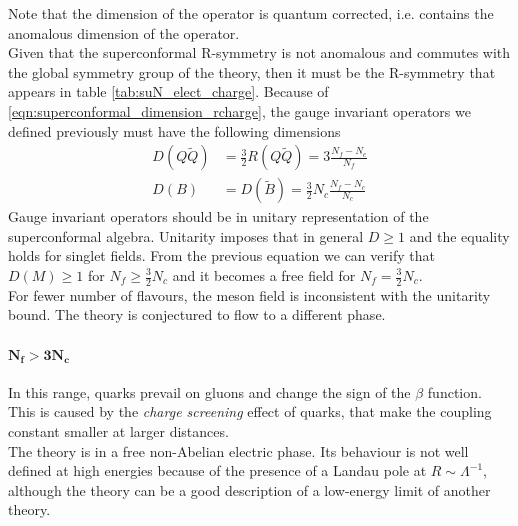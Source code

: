Note that the dimension of the operator is quantum corrected, i.e. contains the anomalous dimension of the operator.
\\
Given that the superconformal R-symmetry is not anomalous and commutes with the global symmetry group of the theory, then it must be the R-symmetry that appears in table \ref{tab:suN_elect_charge}.
Because of \eqref{eqn:superconformal_dimension_rcharge}, the gauge invariant operators we defined previously must have the following dimensions
\begin{align}
 D(Q \tilde{Q}) &= \frac{3}{2} R(Q \tilde{Q}) = 3 \frac{N_f - N_c}{N_f}\\
 D(B) & = D(\tilde{B})  = \frac{3}{2} N_c \frac{N_f - N_c}{N_c}
\end{align}
Gauge invariant operators should be in unitary representation of the superconformal algebra.
Unitarity imposes that in general $D\geq 1$ and the equality holds for singlet fields.
From the previous equation we can verify that $D(M) \geq 1$ for $ N_f \geq \frac{3}{2}N_c$ and it becomes a free field for $N_f = \frac{3}{2}N_c$. 
\\
For fewer number of flavours, the meson field is inconsistent with the unitarity bound.
The theory is conjectured to flow to a different phase.

\paragraph{$\mathbf{ N_f > 3 N_c}$}
In this range, quarks prevail on gluons and change the sign of the $\beta$ function. 
This is caused by the \emph{charge screening} effect of quarks, that make the coupling constant smaller at larger distances.\\
The theory is in a free non-Abelian electric phase.
Its behaviour is not well defined at high energies because of the presence of a Landau pole at $R \sim \Lambda^{-1}$, although the theory can be a good description of a low-energy limit of another theory. 





















